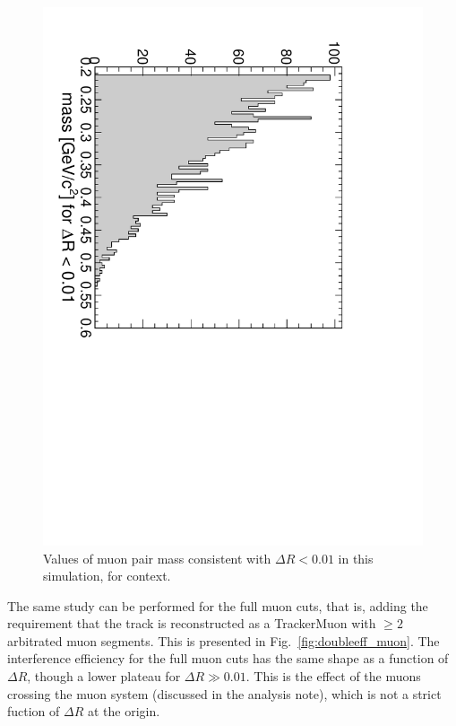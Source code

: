 \documentclass[12pt]{article}
\begin{document}
\begin{figure}
\begin{center}
\includegraphics[height=0.5\linewidth, angle=90]{doubleeff_mass.pdf}
\end{center}

\caption{Values of muon pair mass consistent with $\Delta R < 0.01$ in
  this simulation, for context. \label{fig:doubleeff_mass}}
\end{figure}

The same study can be performed for the full muon cuts, that is,
adding the requirement that the track is reconstructed as a
TrackerMuon with $\ge 2$ arbitrated muon segments.  This is presented
in Fig.~\ref{fig:doubleeff_muon}.  The interference efficiency for the
full muon cuts has the same shape as a function of $\Delta R$, though
a lower plateau for $\Delta R \gg 0.01$.  This is the effect of
the muons crossing the muon system (discussed in the analysis note),
which is not a strict fuction of $\Delta R$ at the origin.
\end{document}
